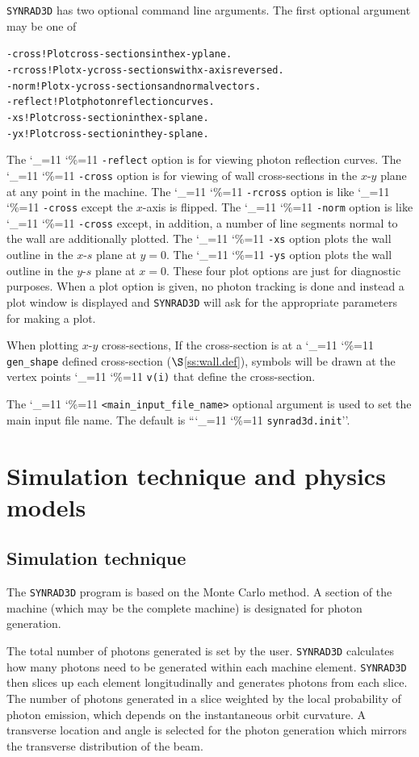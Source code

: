 \documentclass[11pt]{article}
\newcommand{\sref}[1]{$\S$\ref{#1}}
\newcommand{\srthree}{\texttt{SYNRAD3D}\xspace}
\newcommand\ttcmd{\begingroup\catcode`\_=11 \catcode`\%=11 \dottcmd}
\newcommand\dottcmd[1]{\texttt{#1}\endgroup}
\newcommand{\vn}{\ttcmd}
\newlength{\ExBeg}
\newlength{\ExEnd}
\newenvironment{example}
  {\vspace{\ExBeg} \begin{alltt}}
  {\end{alltt} \vspace{\ExEnd}}
\begin{document}
\srthree has two optional command line arguments. 
The first optional argument may be one of
\begin{example}
  -cross        ! Plot cross-sections in the x-y plane.
  -rcross       ! Plot x-y cross-sections with x-axis reversed.
  -norm         ! Plot x-y cross-sections and normal vectors.
  -reflect      ! Plot photon reflection curves.
  -xs           ! Plot cross-section in the x-s plane.
  -yx           ! Plot cross-section in the y-s plane.
\end{example}
The \vn{-reflect} option is for viewing photon reflection curves.  The
\vn{-cross} option is for viewing of wall cross-sections in the
$x$-$y$ plane at any point in the machine. The \vn{-rcross} option is
like \vn{-cross} except the $x$-axis is flipped. The \vn{-norm} option
is like \vn{-cross} except, in addition, a number of line segments
normal to the wall are additionally plotted. The \vn{-xs} option plots
the wall outline in the $x$-$s$ plane at $y = 0$. The \vn{-ys} option
plots the wall outline in the $y$-$s$ plane at $x = 0$. These four
plot options are just for diagnostic purposes. When a plot option is
given, no photon tracking is done and instead a plot window is
displayed and \srthree will ask for the appropriate parameters for
making a plot.

When plotting $x$-$y$ cross-sections, If the cross-section is at a
\vn{gen_shape} defined cross-section (\sref{ss:wall.def}), symbols
will be drawn at the vertex points \vn{v(i)} that define the
cross-section.

The \vn{<main_input_file_name>} optional argument is used to set the
main input file name. The default is ``\vn{synrad3d.init}''. 


\section{Simulation technique and physics models}
\subsection{Simulation technique} 

The \srthree program is based on the Monte
Carlo method. A section of the machine (which may be the complete machine)
is designated for photon generation.

The total number of photons generated is set by the user. \srthree
calculates how many photons need to be generated within each machine
element. \srthree then slices up each element longitudinally and
generates photons from each slice. The number of photons generated in
a slice weighted by the local probability of photon emission, which
depends on the instantaneous orbit curvature. A transverse location
and angle is selected for the photon generation which mirrors the
transverse distribution of the beam.
\end{document}
